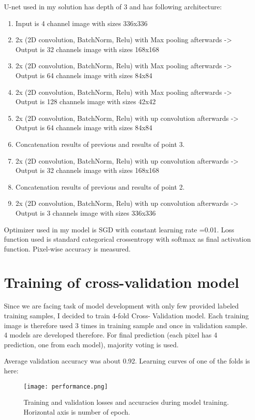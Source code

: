 \documentclass{homework}
\begin{document}
U-net used in my solution has depth of 3 and has following architecture:
\begin{enumerate}
    \item Input is 4 channel image with sizes 336x336 
    \item 2x (2D convolution, BatchNorm, Relu) with Max pooling afterwards  -> Output is 32 channels image with sizes 168x168
    \item 2x (2D convolution, BatchNorm, Relu) with Max pooling afterwards  -> Output is 64 channels image with sizes 84x84
    \item 2x (2D convolution, BatchNorm, Relu) with Max pooling afterwards  -> Output is 128 channels image with sizes 42x42
    \item 2x (2D convolution, BatchNorm, Relu) with up convolution afterwards -> Output is 64 channels image with sizes 84x84
    \item Concatenation results of previous and results of point 3.
    \item 2x (2D convolution, BatchNorm, Relu) with up convolution afterwards -> Output is 32 channels image with sizes 168x168
    \item Concatenation results of previous and results of point 2.
    \item 2x (2D convolution, BatchNorm, Relu) with up convolution afterwards -> Output is 3 channels image with sizes 336x336 
\end{enumerate}

Optimizer used in my model is SGD with constant learning rate =0.01. Loss function used is standard categorical crossentropy with softmax as final activation function. Pixel-wise accuracy is measured.

\section{Training of cross-validation model}
Since we are facing task of model development with only few provided labeled training samples, I decided to train 4-fold Cross- Validation model. Each training image is therefore used 3 times in training sample and once in validation sample. 4 models are developed therefore. For final prediction (each pixel has 4 prediction, one from each model), majority voting is used.

Average validation accuracy was about 0.92.
Learning curves of one of the folds is here:

\begin{figure}[H]
\centering
\texttt{[image: performance.png]}
\caption{Training and validation losses and accuracies during model training. Horizontal axis is number of epoch.}
\centering
\end{figure}
\end{document}
